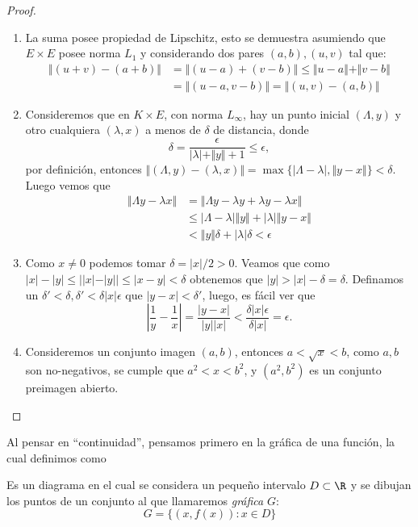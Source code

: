 \documentclass[11pt,oneside,a4paper]{book}
\begin{document}
\begin{proof}
\begin{enumerate}[(1)]
\item La suma posee propiedad de Lipschitz, esto se demuestra asumiendo que $E\times E$ posee norma $L_1$ y considerando dos pares $(a,b),(u,v)$ tal que:
\begin{align*}
\Vert(u+v)-(a+b)\Vert&=\Vert(u-a)+(v-b)\Vert\leq\Vert u-a\Vert+\Vert v-b\Vert\\
&=\Vert(u-a,v-b)\Vert=\Vert(u,v)-(a,b)\Vert
\end{align*}
\item Consideremos que en $K\times E$, con norma $L_\infty$, hay un punto inicial $(\Lambda,y)$ y otro cualquiera $(\lambda,x)$ a menos de $\delta$ de distancia, donde
$$\delta=\frac{\epsilon}{|\lambda|+\Vert y\Vert+1}\leq\epsilon,$$
por definición, entonces $\Vert(\Lambda,y)-(\lambda,x)\Vert=\max\{|\Lambda-\lambda|,\Vert y-x\Vert\}\lt\delta$. Luego vemos que
\begin{align*}
\Vert\Lambda y-\lambda x\Vert&=\Vert\Lambda y-\lambda y+\lambda y-\lambda x\Vert\\
&\leq|\Lambda-\lambda|\Vert y\Vert+|\lambda|\Vert y-x\Vert\\
&\lt \Vert y\Vert\delta+|\lambda|\delta\lt\epsilon
\end{align*}
\item Como $x\neq 0$ podemos tomar $\delta=|x|/2\gt 0$. Veamos que como $|x|-|y|\leq||x|-|y||\leq|x-y|\lt\delta$ obtenemos que $|y|\gt|x|-\delta=\delta$. Definamos un $\delta'\lt\delta,\delta'\lt\delta|x|\epsilon$ que $|y-x|\lt\delta'$, luego, es fácil ver que
$$|\frac{1}{y}-\frac{1}{x}|=\frac{|y-x|}{|y||x|}\lt\frac{\delta|x|\epsilon}{\delta|x|}=\epsilon.$$
\item Consideremos un conjunto imagen $(a,b)$, entonces $a\lt\sqrt{x}\lt b$, como $a,b$ son no-negativos, se cumple que $a^2\lt x\lt b^2$, y $(a^2,b^2)$ es un conjunto preimagen abierto.
\end{enumerate}
\end{proof}
Al pensar en ``continuidad'', pensamos primero en la gráfica de una función, la cual definimos como
\begin{mydef}[Gráfica de $f(x)$]
Es un diagrama en el cual se considera un pequeño intervalo $D\subset\R$ y se dibujan los puntos de un conjunto al que llamaremos \textit{gráfica} $G$:
$$G=\{(x,f(x)):x\in D\}$$
\end{mydef}
\end{document}

